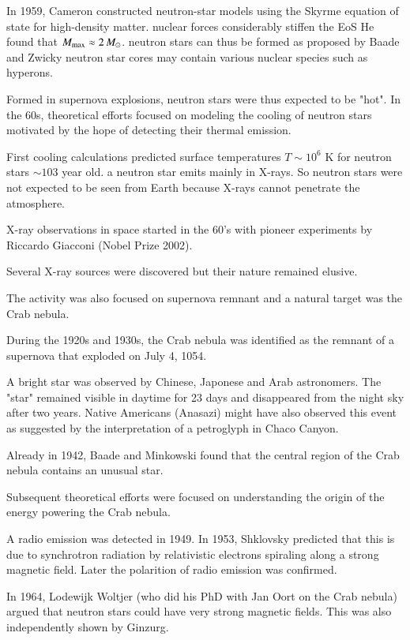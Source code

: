 In 1959, Cameron constructed neutron-star models using the Skyrme equation of state for high-density matter. 
nuclear forces considerably stiffen the EoS
He found that $M_{\mathrm{max}} \approx 2\, M_{\odot}$.
neutron stars can thus be formed as proposed by Baade and Zwicky
neutron star cores may contain various nuclear species such as hyperons.

Formed in supernova explosions, neutron stars were thus expected to be "hot". 
In the 60s, theoretical efforts focused on modeling the cooling of neutron stars motivated by the hope of detecting their thermal emission.

First cooling calculations predicted surface temperatures $T \sim 10^6$ K for neutron stars $\sim 103$ year old.\cite{CS64}
a neutron star emits mainly in X-rays. 
So neutron stars were not expected to be seen from Earth because X-rays cannot penetrate the atmosphere.


X-ray observations in space started in the 60’s with pioneer experiments by Riccardo Giacconi (Nobel Prize 2002).

Several X-ray sources were discovered but their nature remained elusive.

The activity was also focused on supernova remnant and a natural target was the Crab nebula.

During the 1920s and 1930s, the Crab nebula was identified as the remnant of a supernova that exploded on July 4, 1054.

A bright star was observed by Chinese, Japonese and Arab astronomers. 
The "star" remained visible in daytime for 23 days and disappeared from the night sky after two years.
Native Americans (Anasazi) might have also observed this event as suggested by the interpretation of a petroglyph in Chaco Canyon.

Already in 1942, Baade and Minkowski found that the central region of the Crab nebula contains an unusual star.

Subsequent theoretical efforts were focused on understanding the origin of the energy powering the Crab nebula.

A radio emission was detected in 1949. 
In 1953, Shklovsky predicted that this is due to synchrotron radiation by relativistic electrons spiraling along a strong magnetic field. 
Later the polarition of radio emission was confirmed. 

In 1964, Lodewijk Woltjer (who did his PhD with Jan Oort on the Crab nebula) argued that neutron stars could have very strong magnetic fields. \cite{Woltjer64}
This was also independently shown by Ginzurg. \cite{Ginzburg64}


